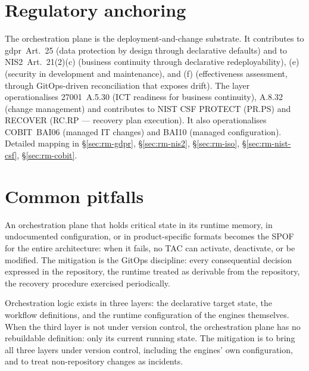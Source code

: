 \section{Regulatory anchoring}
\label{sec:or-regulatory}

\noindent The orchestration plane is the deployment-and-change
substrate. It contributes to \gls{gdpr}~Art.~25 (data protection
by design through declarative defaults) and to NIS2~Art.~21(2)(c)
(business continuity through declarative redeployability), (e)
(security in development and maintenance), and (f) (effectiveness
assessment, through GitOps-driven reconciliation that exposes
drift). The layer operationalises 27001~A.5.30 (ICT readiness for
business continuity), A.8.32 (change management) and contributes
to NIST CSF \textsf{PROTECT} (PR.PS) and \textsf{RECOVER} (RC.RP
--- recovery plan execution). It also operationalises
COBIT~BAI06 (managed IT changes) and BAI10 (managed
configuration). Detailed mapping in
 \S\ref{sec:rm-gdpr},
\S\ref{sec:rm-nis2}, \S\ref{sec:rm-iso},
\S\ref{sec:rm-nist-csf}, \S\ref{sec:rm-cobit}.

\section{Common pitfalls}
\label{sec:or-pitfalls}

\begin{pitfallbox}
\noindent An orchestration plane that holds critical state in its
runtime memory, in undocumented configuration, or in product-specific
formats becomes the SPOF for the entire architecture: when it
fails, no TAC can activate, deactivate, or be modified. The
mitigation is the GitOps discipline: every consequential decision
expressed in the repository, the runtime treated as derivable from
the repository, the recovery procedure exercised periodically.
\end{pitfallbox}

\begin{pitfallbox}
\noindent Orchestration logic exists in three layers: the
declarative target state, the workflow definitions, and the
runtime configuration of the engines themselves. When the third
layer is not under version control, the orchestration plane has
no rebuildable definition: only its current running state. The
mitigation is to bring all three layers under version control,
including the engines' own configuration, and to treat
non-repository changes as incidents.
\end{pitfallbox}

